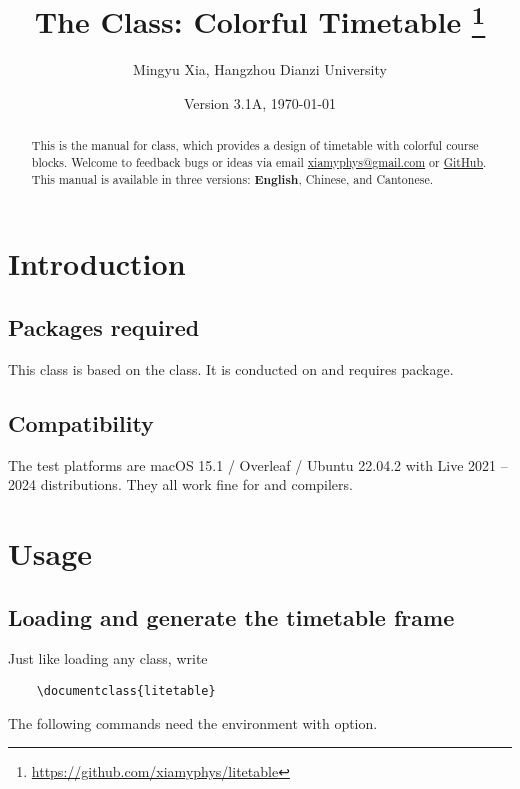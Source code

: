 \documentclass[letterpaper]{l3doc}
\title{
    The \cls{litetable} Class: Colorful Timetable
    \thanks{\url{https://github.com/xiamyphys/litetable}}
}
\author{Mingyu Xia, Hangzhou Dianzi University}
\affil{\href{mailto:xiamyphys@gmail.com}{xiamyphys@gmail.com}}
\date{Version 3.1A, \today}
\begin{document}
\maketitle

\begin{abstract}
    This is the manual for  class, which provides a design of timetable with colorful course blocks. Welcome to feedback bugs or ideas via email \href{mailto:xiamyphys@gmail.com}{xiamyphys@gmail.com} or \href{https://github.com/xiamyphys/litetable/issues}{GitHub}. This manual is available in three versions: \textbf{English}, Chinese, and Cantonese.
\end{abstract}

\section{Introduction}

\subsection{Packages required}

This class is based on the  class. It is conducted on  and requires  package.

\subsection{Compatibility}

The test platforms are macOS 15.1 / Overleaf / Ubuntu 22.04.2 with Live 2021 -- 2024 distributions. They all work fine for  and  compilers.

\section{Usage}

\subsection{Loading  and generate the timetable frame}

Just like loading any class, write

\begin{Verbatim}
    \documentclass{litetable}
\end{Verbatim}

The following commands need the  environment with  option.
\end{document}
